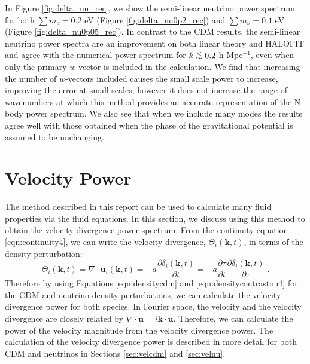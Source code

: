 \documentclass[twocolumn,superscriptaddress,prd]{revtex4}
\def\ltsima{$\; \buildrel < \over \sim \;$}
\def\lsim{\lower.5ex\hbox{\ltsima}}
\newcommand{\halofit}{HALOFIT }
\begin{document}
In Figure \ref{fig:delta_nu_rec}, we show the semi-linear
 neutrino power spectrum for both $\sum m_\nu =
0.2$ eV (Figure \ref{fig:delta_nu0p2_rec}) and $\sum m_\nu = 0.1$ eV
(Figure \ref{fig:delta_nu0p05_rec}).  In contrast to the CDM
 results, the semi-linear neutrino power
spectra are an improvement on both linear theory and \halofit and
agree with the numerical power spectrum for $k \lsim 0.2$ h
Mpc$^{-1}$, even when only the
primary $w$-vector is included in the calculation.  
We find that increasing the number of $w$-vectors included causes the
small scale power to increase, improving the error at
small scales; however it does not increase the range of wavenumbers at
which this method provides an accurate representation of the N-body
power spectrum. We also see that when we include many modes the
 results agree well with those obtained when the phase of
the gravitational potential is assumed to be unchanging.  

\section{Velocity Power}
\label{sec:Velocity}

The method described in this report can be used to
calculate many fluid properties via the fluid equations.  
In this section, we discuss using this method to obtain 
the velocity divergence power
spectrum.  From the continuity equation
\eqref{eqn:continuity4}, we can write the velocity divergence, $\Theta_i(\mathbf{k},t)$, in terms
of the density perturbation:
\begin{equation}\label{eqn:veldivg}
  \Theta_i(\mathbf{k},t) = \nabla \cdot \mathbf{u}_i(\mathbf{k},t) = - a \frac{ \partial \delta_i(\mathbf{k},t)}{\partial
    t} = -a \frac{ \partial \tau}{ \partial t } \frac{ \partial
    \delta_i(\mathbf{k},t) }{ \partial \tau}\;.
\end{equation} 
Therefore by using Equations \eqref{eqn:densitycdm} and \eqref{eqn:densitycontrastnu4} for the
CDM and neutrino density perturbations, we can calculate the velocity divergence power for both species. 
In Fourier space, the velocity and the velocity divergence are closely
related by $ \nabla \cdot \mathbf{u} = i \mathbf{k} \cdot \mathbf{u}
$.  Therefore, we can calculate the power of the velocity magnitude from the velocity divergence power.
The calculation of the velocity divergence power is described in more detail for both
CDM
and neutrinos in Sections \ref{sec:velcdm} and \ref{sec:velnu}.
\end{document}
